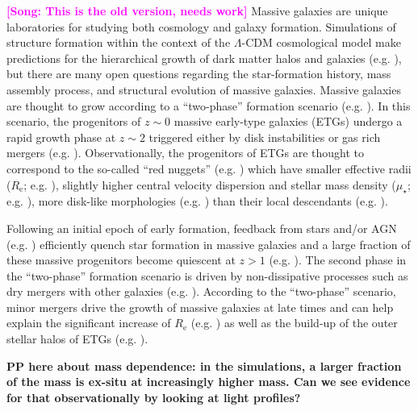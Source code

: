 \documentclass[a4paper,fleqn,usenatbib]{mnras}
\def\mden{{$\mu_{\star}$}}
\newcommand{\song}[1]{\textcolor{magenta}{\textbf{[Song: #1]}}}
\begin{document}
    \song{This is the old version, needs work}
    Massive galaxies are unique laboratories for studying both cosmology and galaxy 
    formation. 
    Simulations of structure formation within the context of the $\Lambda$-CDM 
    cosmological model make predictions for the hierarchical growth of dark matter halos 
    and galaxies (e.g. \citealt{Baugh1996, DeLucia2006}), but there are many open 
    questions regarding the star-formation history, mass assembly process, and 
    structural evolution of massive galaxies. 
    Massive galaxies are thought to grow according to a ``two-phase'' formation scenario 
    (e.g. \citealt{Oser2010, Oser2012}). 
    In this scenario, the progenitors of $z{\sim} 0$ massive early-type galaxies (ETGs) 
    undergo a rapid growth phase at $z{\sim} 2$ triggered either by disk instabilities 
    or gas rich mergers (e.g. \citealt{Hopkins2008, Dekel2009}). 
    Observationally, the progenitors of ETGs are thought to correspond to the so-called 
    ``red nuggets'' (e.g. \citealt{Damjanov2009}) which have smaller effective radii 
    ($R_{\mathrm{e}}$; e.g. \citealt{Trujillo2006, vanDokkum2008, Cimatti2008}), 
    slightly higher central velocity dispersion and stellar mass density 
    (\mden{}; e.g. \citealt{vandeSande2011, Belli2014}), more disk-like morphologies 
    (e.g. \citealt{vanderWel2011}) than their local descendants 
    (e.g. \citealt{Bezanson2009, vanDokkum2010}).
    
    Following an initial epoch of early formation, feedback from stars and/or AGN 
    (e.g. \citealt{Sijacki2007, Fabian2012}) efficiently quench star formation in 
    massive galaxies and a large fraction of these massive progenitors become quiescent 
    at $z>1$ (e.g. \citealt{Bezanson2009, Kriek2016}). 
    The second phase in the ``two-phase'' formation scenario is driven by 
    non-dissipative processes such as dry mergers with other galaxies 
    (e.g. \citealt{Naab2006, Khochfar2006}). 
    According to the ``two-phase'' scenario, minor mergers drive the growth of massive 
    galaxies at late times and can help explain the significant increase
    of $R_{\mathrm{e}}$ (e.g. \citealt{Newman2012, vdWel2014}) as well as the build-up 
    of the outer stellar halos of ETGs (e.g.  \citealt{Szomoru2012, Patel2013}).         

    {\bf PP here about mass dependence: in the simulations, a larger fraction of the mass 
    is ex-situ at increasingly higher mass. Can we see evidence for that observationally by 
    looking at light profiles?}
   
\end{document}
